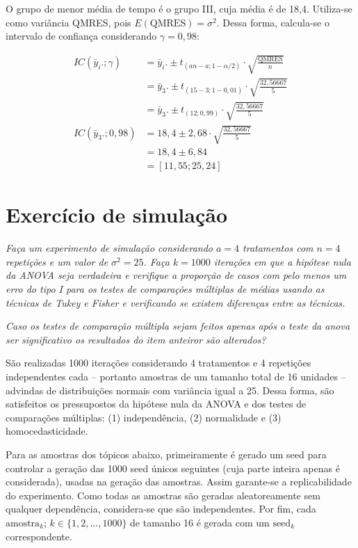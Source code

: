 \documentclass[
]{article}
\begin{document}
O grupo de menor média de tempo é o grupo III, cuja média é de 18,4.
Utiliza-se como variância QMRES, pois
\(E\left(\text{QMRES}\right) = \sigma^2\). Dessa forma, calcula-se o
intervalo de confiança considerando \(\gamma = 0,98\):

\begin{align}
  IC\left( \bar{y}_i.; \gamma \right) &= \bar{y}_i. \pm t_{(an-a; 1-\alpha/2)} \cdot \sqrt{\frac{\text{QMRES}}{n}}\\
  &= \bar{y}_3. \pm t_{(15-3; 1-0,01)} \cdot \sqrt{\frac{32,56667}{5}}\\
  &= \bar{y}_3. \pm t_{(12; 0,99)} \cdot \sqrt{\frac{32,56667}{5}}\\
 IC\left( \bar{y}_3.; 0,98 \right) &= 18,4 \pm 2,68 \cdot \sqrt{\frac{32,56667}{5}}\\
  &= 18,4 \pm 6,84\\
  &= \left[ 11,55 ; 25,24 \right]
\end{align}

\hypertarget{exercuxedcio-de-simulauxe7uxe3o}{%
\section{Exercício de simulação}\label{exercuxedcio-de-simulauxe7uxe3o}}

\emph{Faça um experimento de simulação considerando \(a = 4\)
tratamentos com \(n = 4\) repetições e um valor de \(\sigma^2 = 25\).
Faça \(k = 1000\) iterações em que a hipótese nula da ANOVA seja
verdadeira e verifique a proporção de casos com pelo menos um erro do
tipo I para os testes de comparações múltiplas de médias usando as
técnicas de Tukey e Fisher e verificando se existem diferenças entre as
técnicas.}

\emph{Caso os testes de comparação múltipla sejam feitos apenas após o
teste da anova ser significativo os resultados do item anteiror são
alterados?}

São realizadas 1000 iterações considerando 4 tratamentos e 4 repetições
independentes cada -- portanto amostras de um tamanho total de 16
unidades -- advindas de distribuições normais com variância igual a 25.
Dessa forma, são satisfeitos os pressupostos da hipótese nula da ANOVA e
dos testes de comparações múltiplas: (1) independência, (2) normalidade
e (3) homocedasticidade.

Para as amostras dos tópicos abaixo, primeiramente é gerado um seed para
controlar a geração das 1000 seed únicos seguintes (cuja parte inteira
apenas é considerada), usadas na geração das amostras. Assim garante-se
a replicabilidade do experimento. Como todas as amostras são geradas
aleatoreamente sem qualquer dependência, considera-se que são
independentes. Por fim, cada
\(\text{amostra}_k; \, k \in \{1, 2, ..., 1000\}\) de tamanho 16 é
gerada com um \(\text{seed}_k\) correspondente.
\end{document}
